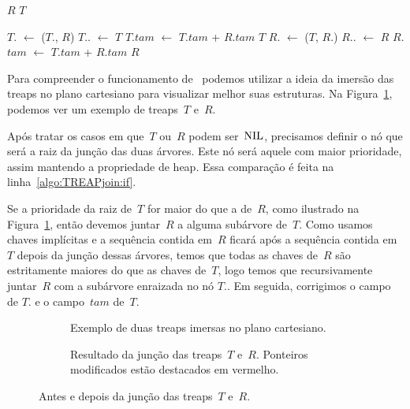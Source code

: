 
\begin{algorithm}
\caption{\treapJoin($T$, $R$)}
\label{Algo:TREAPjoin}
\begin{algorithmic}[1]
 \Return $R$
\EndIf
{} \Return $T$
\EndIf

\label{algo:TREAPjoin:if}
  \State $T$. $\gets$ \treapJoin($T$., $R$)
  \State $T$.. $\gets$ $T$
  \State $T$.$tam$ $\gets$ $T$.$tam$ + $R$.$tam$
  \State \Return $T$
\Else 
  \State $R$. $\gets$ \treapJoin($T$, $R$.)
  \State $R$.. $\gets$ $R$
  \State $R$.$tam$ $\gets$ $T$.$tam$ + $R$.$tam$
  \State \Return $R$
\EndIf
\end{algorithmic}
\end{algorithm}

Para compreender o funcionamento de~\treapJoin{} podemos utilizar a ideia da imersão das treaps no plano cartesiano para visualizar melhor suas estruturas.
Na Figura~\ref{fig:treap-join}, podemos ver um exemplo de treaps~$T$ e~$R$.

Após tratar os casos em que~$T$ ou~$R$ podem ser~$\text{NIL}$, precisamos definir o nó que será a raiz da junção das duas árvores.
Este nó será aquele com maior prioridade, assim mantendo a propriedade de heap.
Essa comparação é feita na linha~\ref{algo:TREAPjoin:if}.

Se a prioridade da raiz de~$T$ for maior do que a de~$R$, como ilustrado na Figura~\ref{fig:treap-join}, então devemos juntar~$R$ a alguma subárvore de~$T$.
Como usamos chaves implícitas e a sequência contida em~$R$ ficará após a sequência contida em~$T$ depois da junção dessas árvores,
temos que todas as chaves de~$R$ são estritamente maiores do que as chaves de~$T$, logo temos que recursivamente juntar~$R$ com a subárvore enraizada no nó $T$..
Em seguida, corrigimos o campo  de $T$. e o campo~$tam$ de~$T$.


\begin{figure}[htb]
\begin{subfigure}{0.4\textwidth}
\scalebox{0.55}{

}
\caption{Exemplo de duas treaps imersas no plano cartesiano.}
\label{fig:treap-join}
\end{subfigure}
\hspace{1cm}
\begin{subfigure}{0.4\textwidth}
\scalebox{0.55}{

}
\caption{Resultado da junção das treaps~$T$ e~$R$. Ponteiros modificados estão destacados em vermelho.}
\label{fig:treap-join-depois}
\end{subfigure}
\caption{Antes e depois da junção das treaps~$T$ e~$R$.}
\end{figure}



